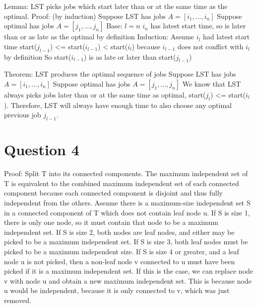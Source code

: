 \documentclass[11pt, oneside]{article}
\begin{document}
Lemma: LST picks jobs which start later than or at the same time as the optimal. \newline
Proof: (by induction) \newline
Suppose LST has jobs $A = [i_1, ..., i_n]$ \newline
Suppose optimal has jobs $A = [j_1, ..., j_n]$ \newline
Base: $l = n$ \newline
$i_n$ has latest start time, so is later than or as late as the optimal by definition \newline
Induction: \newline
Assume $i_l$ had latest start time \newline
start($j_{l-1}$) <= start($i_{l-1}$) < start($i_l$) because $i_{l-1}$ does not conflict with $i_l$ by definition \newline
So start($i_{l-1}$) is as late or later than start($j_{l-1}$) \newline

Theorem: LST produces the optimal sequence of jobs \newline
Suppose LST has jobs $A = [i_1, ..., i_n]$ \newline
Suppose optimal has jobs $A = [j_1, ..., j_n]$ \newline
We know that LST always picks jobs later than or at the same time as optimal, start($j_l$) <= start($i_l$). Therefore, LST will always have enough time to also choose any optimal previous job $j_{l-1}$. \newline

\clearpage

\section{Question 4}
Proof: \newline
Split T into its connected components.
The maximum independent set of T is equivalent to the combined maximum independent set of each connected component because each connected component is disjoint and thus fully independent from the others. \newline
Assume there is a maximum-size independent set S in a connected component of T which does not contain leaf node u. If S is size 1, there is only one node, so it must contain that node to be a maximum independent set. If S is size 2, both nodes are leaf nodes, and either may be picked to be a maximum independent set. If S is size 3, both leaf nodes must be picked to be a maximum independent size. If S is size 4 or greater, and a leaf node u is not picked, then a non-leaf node v connected to u must have been picked if it is a maximum independent set. If this is the case, we can replace node v with node u and obtain a new maximum independent set. This is because node u would be independent, because it is only connected to v, which was just removed. \newline
\end{document}
